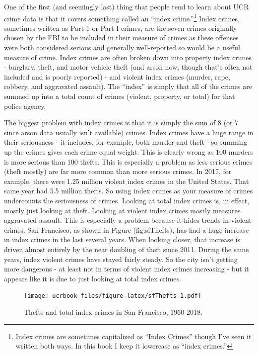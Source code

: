 \documentclass[
  12pt,
  openany]{book}
\begin{document}
One of the first (and seemingly last) thing that people tend to learn about UCR crime data is that it covers something called an ``index crime.''\footnote{Index crimes are sometimes capitalized as ``Index Crimes'' though I've seen it written both ways. In this book I keep it lowercase as ``index crimes.''} Index crimes, sometimes written as Part 1 or Part I crimes, are the seven crimes originally chosen by the FBI to be included in their measure of crimes as these offenses were both considered serious and generally well-reported so would be a useful measure of crime. Index crimes are often broken down into property index crimes - burglary, theft, and motor vehicle theft (and arson now, though that's often not included and is poorly reported) - and violent index crimes (murder, rape, robbery, and aggravated assault). The ``index'' is simply that all of the crimes are summed up into a total count of crimes (violent, property, or total) for that police agency.

The biggest problem with index crimes is that it is simply the sum of 8 (or 7 since arson data usually isn't available) crimes. Index crimes have a huge range in their seriousness - it includes, for example, both murder and theft - so summing up the crimes gives each crime equal weight. This is clearly wrong as 100 murders is more serious than 100 thefts. This is especially a problem as less serious crimes (theft mostly) are far more common than more serious crimes. In 2017, for example, there were 1.25 million violent index crimes in the United States. That same year had 5.5 million thefts. So using index crimes as your measure of crimes undercounts the seriousness of crimes. Looking at total index crimes is, in effect, mostly just looking at theft. Looking at violent index crimes mostly measures aggravated assault. This is especially a problem because it hides trends in violent crimes. San Francisco, as shown in Figure \citet{ref}(fig:sfThefts), has had a huge increase in index crimes in the last several years. When looking closer, that increase is driven almost entirely by the near doubling of theft since 2011. During the same years, index violent crimes have stayed fairly steady. So the city isn't getting more dangerous - at least not in terms of violent index crimes increasing - but it appears like it is due to just looking at total index crimes.

\begin{figure}
\centering
\texttt{[image: ucrbook\_files/figure-latex/sfThefts-1.pdf]}
\caption{\label{fig:sfThefts}Thefts and total index crimes in San Francisco, 1960-2018.}
\end{figure}
\end{document}
